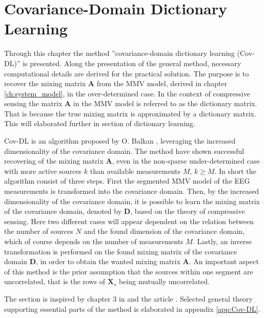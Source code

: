 \chapter{Covariance-Domain Dictionary Learning}\label{ch:Cov-DL}
Through this chapter the method ''covariance-domain dictionary learning (Cov-DL)'' is presented. Along the presentation of the general method, necessary computational details are derived for the practical solution.
The purpose is to recover the mixing matrix $\textbf{A}$ from the MMV model, derived in chapter \ref{ch:system_model}, in the over-determined case.   
In the context of compressive sensing the matrix $\textbf{A}$ in the MMV model is referred to as the dictionary matrix. That is because the true mixing matrix is approximated by a dictionary matrix. This will elaborated further in section of dictionary learning.  

Cov-DL is an algorithm proposed by O. Balkan \cite{Balkan2015}, leveraging the increased dimensionality of the covariance domain. The method have shown successful recovering of the mixing matrix $\textbf{A}$, even in the non-sparse under-determined case with more active sources $k$ than available measurements $M$, $k \geq M$. 
In short the algorithm consist of three steps. 
First the segmented MMV model of the EEG measurements is transformed into the covariance domain. Then, by the increased dimensionality of the covariance domain, it is possible to learn the mixing matrix of the covariance domain, denoted by $\textbf{D}$, based on the theory of compressive sensing. Here two different cases will appear dependent on the relation between the number of sources $N$ and the found dimension of the covariance domain, which of course depends on the number of measurements $M$. Lastly, an inverse transformation is performed on the found mixing matrix of the covariance domain $\textbf{D}$, in order to obtain the wanted mixing matrix $\textbf{A}$. 
An important aspect of this method is the prior assumption that the sources within one segment are uncorrelated, that is the rows of $\textbf{X}_s$ being mutually uncorrelated. 

The section is inspired by chapter 3 in \cite{phd2015} and the article \cite{Balkan2015}. Selected general theory supporting essential parts of the method is elaborated in appendix \ref{app:Cov-DL}.


